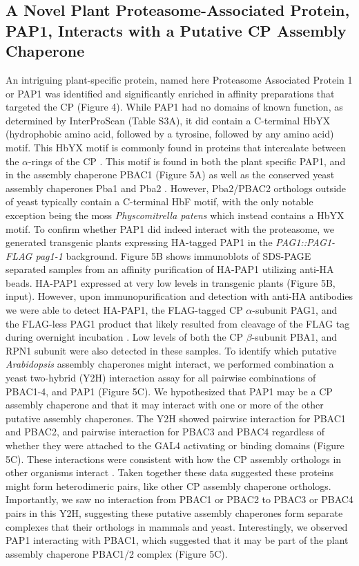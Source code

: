 \subsection{A Novel Plant Proteasome-Associated Protein, PAP1, Interacts with a Putative CP Assembly Chaperone}
An intriguing plant-specific protein, named here Proteasome Associated Protein 1 or PAP1 was identified and significantly enriched in affinity preparations that targeted the CP (Figure 4). While PAP1 had no domains of known function, as determined by InterProScan (Table S3A), it did contain a C-terminal HbYX (hydrophobic amino acid, followed by a tyrosine, followed by any amino acid) motif. This HbYX motif is commonly found in proteins that intercalate between the $\alpha$-rings of the CP \citep{kusmierczyk11}. This motif is found in both the plant specific PAP1, and in the assembly chaperone PBAC1 (Figure 5A) as well as the conserved yeast assembly chaperones Pba1 and Pba2 \citep{kusmierczyk11}. However, Pba2/PBAC2 orthologs outside of yeast typically contain a C-terminal HbF motif, with the only notable exception being the moss \textit{Physcomitrella patens} which instead contains a HbYX motif.   To confirm whether PAP1 did indeed interact with the proteasome, we generated transgenic plants expressing HA-tagged PAP1 in the \textit{PAG1::PAG1-FLAG pag1-1} background. Figure 5B shows immunoblots of SDS-PAGE separated samples from an affinity purification of HA-PAP1 utilizing anti-HA beads. HA-PAP1 expressed at very low levels in transgenic plants (Figure 5B, input). However, upon immunopurification and detection with anti-HA antibodies we were able to detect HA-PAP1, the FLAG-tagged CP $\alpha$-subunit PAG1, and the FLAG-less PAG1 product that likely resulted from cleavage of the FLAG tag during overnight incubation \citep{book10}. Low levels of both the CP $\beta$-subunit PBA1, and RPN1 subunit were also detected in these samples. 
To identify which putative \textit{Arabidopsis} assembly chaperones might interact, we performed combination a yeast two-hybrid (Y2H) interaction assay for all pairwise combinations of PBAC1-4, and PAP1 (Figure 5C). We hypothesized that PAP1 may be a CP assembly chaperone and that it may interact with one or more of the other putative assembly chaperones. The Y2H showed pairwise interaction for PBAC1 and PBAC2, and pairwise interaction for PBAC3 and PBAC4 regardless of whether they were attached to the GAL4 activating or binding domains (Figure 5C). These interactions were consistent with how the CP assembly orthologs in other organisms interact \citep{murata09}.  Taken together these data suggested these proteins might form heterodimeric pairs, like other CP assembly chaperone orthologs. Importantly, we saw no interaction from PBAC1 or PBAC2 to PBAC3 or PBAC4 pairs in this Y2H, suggesting these putative assembly chaperones form separate complexes that their orthologs in mammals and yeast. Interestingly, we observed PAP1 interacting with PBAC1, which suggested that it may be part of the plant assembly chaperone PBAC1/2 complex (Figure 5C). 
